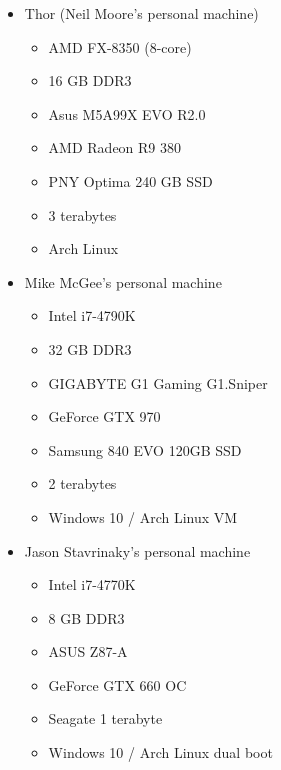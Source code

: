 \documentclass[letterpaper, 11pt]{article}
\begin{document}
\begin{itemize}
 \item Thor (Neil Moore's personal machine)
 \begin{itemize}
  \item{ AMD FX-8350 (8-core)}
  \item{ 16 GB DDR3}
  \item{ Asus M5A99X EVO R2.0}
  \item{ AMD Radeon R9 380}
  \item{ PNY Optima 240 GB SSD}
  \item{ 3 terabytes}
  \item{ Arch Linux}
 \end{itemize}

 \item Mike McGee's personal machine
 \begin{itemize}
  \item{ Intel i7-4790K}
  \item{ 32 GB DDR3}
  \item{ GIGABYTE G1 Gaming G1.Sniper}
  \item{ GeForce GTX 970}
  \item{ Samsung 840 EVO 120GB SSD}
  \item{ 2 terabytes}
  \item{ Windows 10 / Arch Linux VM}
 \end{itemize}

 \item Jason Stavrinaky's personal machine
 \begin{itemize}
  \item{ Intel i7-4770K}
  \item{ 8 GB DDR3}
  \item{ ASUS Z87-A}
  \item{ GeForce GTX 660 OC}
  \item{ Seagate 1 terabyte}
  \item{ Windows 10 / Arch Linux dual boot}
 \end{itemize}


\end{itemize}
\end{document}
